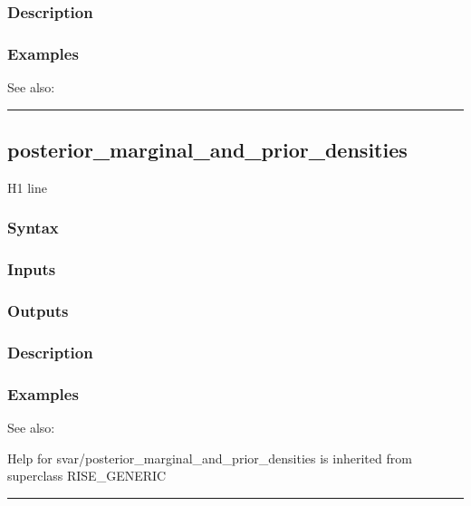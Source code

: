 \documentclass[letterpaper,10pt,english]{sphinxmanual}
\begin{document}
\subsubsection{Description}
\label{classes/models/@svar/svar:id72}

\subsubsection{Examples}
\label{classes/models/@svar/svar:id73}
See also:


\bigskip\hrule{}\bigskip



\subsection{posterior\_marginal\_and\_prior\_densities}
\label{classes/models/@svar/svar:id74}\label{classes/models/@svar/svar:posterior-marginal-and-prior-densities}
H1 line


\subsubsection{Syntax}
\label{classes/models/@svar/svar:id75}

\subsubsection{Inputs}
\label{classes/models/@svar/svar:id76}

\subsubsection{Outputs}
\label{classes/models/@svar/svar:id77}

\subsubsection{Description}
\label{classes/models/@svar/svar:id78}

\subsubsection{Examples}
\label{classes/models/@svar/svar:id79}
See also:

Help for svar/posterior\_marginal\_and\_prior\_densities is inherited from superclass RISE\_GENERIC


\bigskip\hrule{}\bigskip
\end{document}

